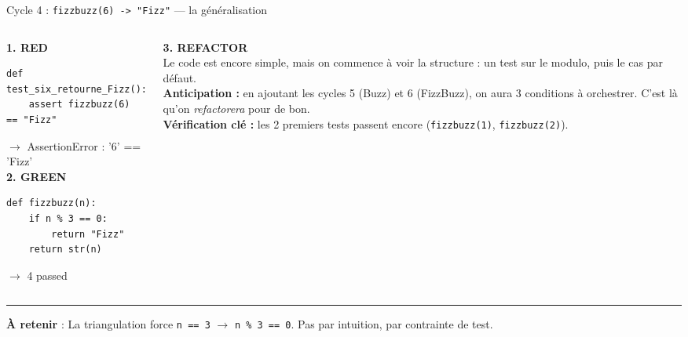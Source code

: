 \documentclass[aspectratio=169,11pt]{beamer}
\newcommand{\takeaway}[1]{%
\vfill\begin{beamercolorbox}[wd=\linewidth,sep=0.4em]{}
\color{accent2}\rule[0.6ex]{1.2em}{1.2pt}\hspace{0.4em}%
\textbf{\color{accent2}\small À retenir} \textcolor{textsoft}{:} %
{\small\color{textmain}#1}
\end{beamercolorbox}}
\begin{document}
\begin{frame}[fragile,t,shrink=15]{Cycle 4 : \texttt{fizzbuzz(6) -> "Fizz"} --- la généralisation}
\begin{columns}[T,onlytextwidth]
\begin{column}{0.48\textwidth}
\textbf{\color{bad}1. RED}
\begin{lstlisting}[style=pythondark]
def test_six_retourne_Fizz():
    assert fizzbuzz(6) == "Fizz"
\end{lstlisting}
{\color{bad}\scriptsize $\to$ AssertionError : '6' == 'Fizz'}
\vspace{0.4em}\\
\textbf{\color{good}2. GREEN}
\begin{lstlisting}[style=pythondark]
def fizzbuzz(n):
    if n % 3 == 0:
        return "Fizz"
    return str(n)
\end{lstlisting}
{\color{good}\scriptsize $\to$ 4 passed}
\end{column}
\begin{column}{0.48\textwidth}
\vspace{0.1cm}\textbf{\color{accent}3. REFACTOR}\\[0.2em]
\footnotesize Le code est encore simple, mais on commence à voir la structure : un test sur le modulo, puis le cas par défaut.\\[0.4em]
\textbf{Anticipation :} en ajoutant les cycles 5 (Buzz) et 6 (FizzBuzz), on aura 3 conditions à orchestrer. C'est là qu'on \emph{refactorera} pour de bon.\\[0.4em]
\textbf{Vérification clé :} les 2 premiers tests passent encore (\texttt{fizzbuzz(1)}, \texttt{fizzbuzz(2)}).
\end{column}
\end{columns}
\takeaway{La triangulation force \texttt{n == 3} $\to$ \texttt{n \% 3 == 0}. Pas par intuition, par contrainte de test.}
\end{frame}
\end{document}
